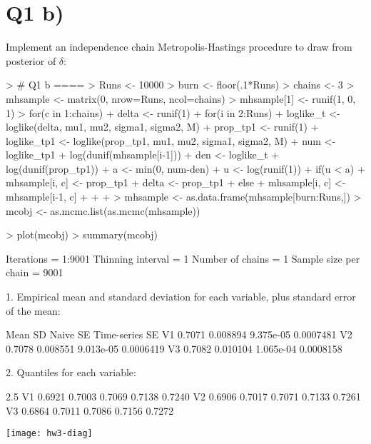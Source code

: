 \documentclass{article}
\begin{document}
\section*{Q1 b)}
Implement an independence chain Metropolis-Hastings procedure to draw from posterior of $\delta$:
\begin{Schunk}
\begin{Sinput}
> # Q1 b ====
> Runs <- 10000
> burn <- floor(.1*Runs)
> chains <- 3
> mhsample <- matrix(0, nrow=Runs, ncol=chains)
> mhsample[1] <- runif(1, 0, 1)
> for(c in 1:chains){
+   delta <- runif(1)
+   for(i in 2:Runs){
+     loglike_t <- loglike(delta, mu1, mu2, sigma1, sigma2, M)
+     prop_tp1 <- runif(1)
+     loglike_tp1 <- loglike(prop_tp1, mu1, mu2, sigma1, sigma2, M)
+     num <-  loglike_tp1 + log(dunif(mhsample[i-1]))
+     den <- loglike_t + log(dunif(prop_tp1))
+     a <- min(0, num-den)
+     u <- log(runif(1))
+     if(u < a){
+       mhsample[i, c] <- prop_tp1
+       delta <- prop_tp1
+     }else{
+       mhsample[i, c] <- mhsample[i-1, c]
+     }
+   }
+ }
> mhsample <- as.data.frame(mhsample[burn:Runs,])
> mcobj <- as.mcmc.list(as.mcmc(mhsample))
\end{Sinput}
\end{Schunk}
\begin{Schunk}
\begin{Sinput}
> plot(mcobj)
> summary(mcobj)
\end{Sinput}
\begin{Soutput}
Iterations = 1:9001
Thinning interval = 1 
Number of chains = 1 
Sample size per chain = 9001 

1. Empirical mean and standard deviation for each variable,
   plus standard error of the mean:

     Mean       SD  Naive SE Time-series SE
V1 0.7071 0.008894 9.375e-05      0.0007481
V2 0.7078 0.008551 9.013e-05      0.0006419
V3 0.7082 0.010104 1.065e-04      0.0008158

2. Quantiles for each variable:

     2.5%    25%    50%    75%  97.5%
V1 0.6921 0.7003 0.7069 0.7138 0.7240
V2 0.6906 0.7017 0.7071 0.7133 0.7261
V3 0.6864 0.7011 0.7086 0.7156 0.7272
\end{Soutput}
\end{Schunk}
\texttt{[image: hw3-diag]}
\end{document}
